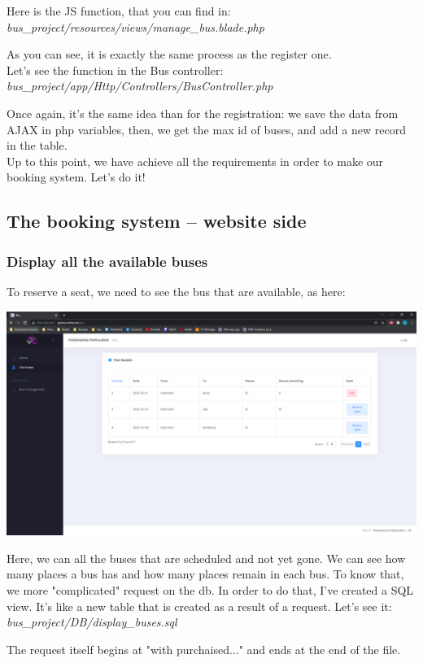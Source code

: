 \documentclass[12pt,a4paper,openany]{book}
\begin{document}
\noindent Here is the JS function, that you can find in:\\
\emph{bus\_project/resources/views/manage\_bus.blade.php}

\bigskip
As you can see, it is exactly the same process as the register one.\\

Let's see the function in the Bus controller:\\
\emph{bus\_project/app/Http/Controllers/BusController.php}

\bigskip
Once again, it's the same idea than for the registration: we save the data from AJAX in php variables, then, we get the max id of buses, and add a new record in the table.\\

Up to this point, we have achieve all the requirements in order to make our booking system. Let's do it!
\pagebreak

\subsection{The booking system -- website side}
\subsubsection{Display all the available buses}
To reserve a seat, we need to see the bus that are available, as here:
\begin{center}
	\includegraphics[scale=0.35]{Figs/fig14}
\end{center}
Here, we can all the buses that are scheduled and not yet gone. We can see how many places a bus has and how many places remain in each bus. To know that, we more "complicated" request on the db. In order to do that, I've created a SQL view. It's like a new table that is created as a result of a request. Let's see it:\\
\emph{bus\_project/DB/display\_buses.sql}

\bigskip
The request itself begins at "with purchaised..." and ends at the end of the file.\\
\end{document}
